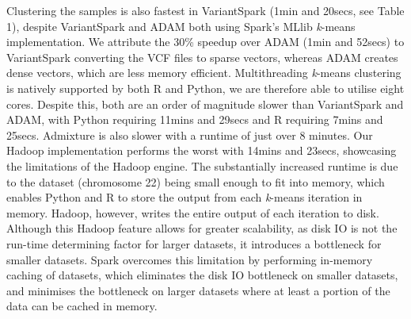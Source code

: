 \documentclass{bmcart}
\newcommand{\variantSpark}{{\sc VariantSpark}}
\newcommand{\kMeans}{\textit{k}-means}
\begin{document}
Clustering the samples is also fastest in \variantSpark{} (1min and 20secs, see Table 1), despite \variantSpark{} and {\sc ADAM} both using {\sc Spark}'s MLlib \kMeans{} implementation. %
We attribute the 30\% speedup over {\sc ADAM} (1min and 52secs) to \variantSpark{} converting the VCF files to sparse vectors, whereas {\sc ADAM} creates dense vectors, which are less memory efficient. %
Multithreading \kMeans{} clustering is natively supported by both R and Python, we are therefore able to utilise eight cores. 
Despite this, both are an order of magnitude slower than \variantSpark{} and {\sc ADAM}, with Python requiring 11mins and 29secs and R requiring 7mins and 25secs.
{\sc Admixture} is also slower with a runtime of just over 8 minutes. 
Our Hadoop implementation performs the worst with 14mins and 23secs, showcasing the limitations of the Hadoop engine. %
The substantially increased runtime is due to the dataset (chromosome 22) being small enough to fit into memory, which enables Python and R to store the output from each \kMeans{} iteration in memory. 
Hadoop, however, writes the entire output of each iteration to disk.
Although this Hadoop feature allows for greater scalability, as disk IO is not the run-time determining factor for larger datasets, it introduces a bottleneck for smaller datasets.
{\sc Spark} overcomes this limitation by performing in-memory caching of datasets, which eliminates the disk IO bottleneck on smaller datasets, and minimises the bottleneck on larger datasets where at least a portion of the data can be cached in memory.
\end{document}
